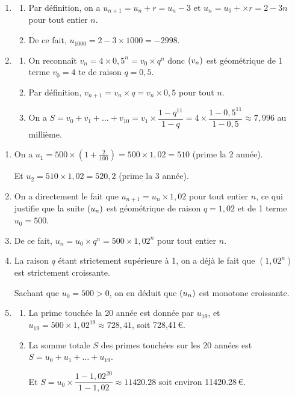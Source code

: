 \documentclass[a4paper,11pt]{article}
\begin{document}
\begin{enumerate}
	\item 
	\begin{enumerate}
		\item Par définition, on a $u_{n+1}=u_n+r=u_n-3$ et $u_n=u_0+\times r = 2-3n$ pour tout entier $n$.
		\item De ce fait, $u_{1000}=2-3\times1000=-2998$.
	\end{enumerate}
	\item 
	\begin{enumerate}
		\item On reconnaît $v_n = 4 \times 0,5^n = v_0 \times q^n$ donc $\suiten[v]$ est géométrique de 1 terme $v_0=4$ te de raison $q=0,5$.
		\item Par définition, $v_{n+1}=v_n\times q = v_n \times 0,5$ pour tout $n$.
		\item On a $S=v_0+v_1+\ldots+v_{10} = v_1 \times \dfrac{1-q^{11}}{1-q}=4 \times \dfrac{1-0,5^{11}}{1-0,5} \approx 7,996$ au millième.
	\end{enumerate}
\end{enumerate}

\medskip


\begin{enumerate}
	\item On a $u_1 = 500 \times \left(1+\frac{2}{100}\right) = 500 \times 1,02 = 510$ (prime la 2 année).
	
	Et $u_2 = 510 \times 1,02 = 520,2$ (prime la 3 année).
	\item On a directement le fait que $u_{n+1}=u_n \times 1,02$ pour tout entier $n$, ce qui justifie que la suite $\suiten$ est géométrique de raison $q=1,02$ et de 1 terme $u_0=500$.
	\item De ce fait, $u_n=u_0 \times q^n = 500 \times 1,02^n$ pour tout entier $n$.
	\item La raison $q$ étant strictement supérieure à 1, on a déjà le fait que $\left(1,02^n\right)$ est strictement croissante.
	
	Sachant que $u_0=500>0$, on en déduit que $\suiten$ est monotone croissante.
	\item 
	\begin{enumerate}
		\item La prime touchée la 20 année est donnée par $u_{19}$, et $u_{19}=500 \times 1,02^{19} \approx 728,41$, soit 728,41\,€.
		\item La somme totale $S$ des primes touchées sur les 20 années est $S=u_0+u_1+\ldots+u_{19}$.
		
		Et $S=u_0 \times \dfrac{1-1,02^{20}}{1-1,02} \approx \num{11420,28}$ soit environ \num{11420,28}\,€.
	\end{enumerate}
\end{enumerate}
\end{document}
